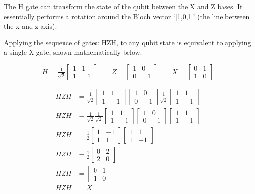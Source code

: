 The H gate can transform the state of the qubit between the X and Z bases. It essentially performs a rotation around the Bloch vector `[1,0,1]' (the line between the x and z-axis).

Applying the sequence of gates: HZH, to any qubit state is equivalent to applying a single X-gate, shown mathematically below.

$$ H = \tfrac{1}{\sqrt{2}}\begin{bmatrix} 1 & 1 \\ 1 & -1 \end{bmatrix} \quad\quad  Z = \begin{bmatrix} 1 & 0 \\ 0 & -1 \end{bmatrix} \quad\quad  X = \begin{bmatrix} 0 & 1 \\ 1 & 0 \end{bmatrix} $$

\begin{equation*} 
\begin{split}
HZH & = \tfrac{1}{\sqrt{2}}\begin{bmatrix} 1 & 1 \\ 1 & -1 \end{bmatrix} \begin{bmatrix} 1 & 0 \\ 0 & -1 \end{bmatrix}\tfrac{1}{\sqrt{2}}\begin{bmatrix} 1 & 1 \\ 1 & -1 \end{bmatrix} \\
HZH & = \tfrac{1}{\sqrt{2}}\tfrac{1}{\sqrt{2}}\begin{bmatrix} 1 & 1 \\ 1 & -1 \end{bmatrix} \begin{bmatrix} 1 & 0 \\ 0 & -1 \end{bmatrix}\begin{bmatrix} 1 & 1 \\ 1 & -1 \end{bmatrix} \\
HZH & = \tfrac{1}{2}\begin{bmatrix} 1 & -1 \\ 1 & 1 \end{bmatrix}\begin{bmatrix} 1 & 1 \\ 1 & -1 \end{bmatrix}\\
HZH & = \tfrac{1}{2}\begin{bmatrix} 0 & 2 \\ 2 & 0 \end{bmatrix} \\
HZH & = \begin{bmatrix} 0 & 1 \\ 1 & 0 \end{bmatrix} \\
HZH & = X
\end{split}
\end{equation*}

